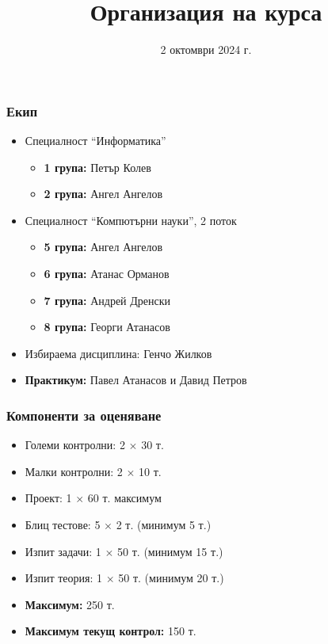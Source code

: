 \documentclass[alsotrans]{beamerswitch}
\title{Организация на курса}
\date{2 октомври 2024 г.}
\begin{document}
\begin{frame}
  \titlepage
\end{frame}

\begin{frame}
  \frametitle{Екип}

  \begin{itemize}
  \item Специалност ``Информатика''
    \begin{itemize}
    \item \textbf{1 група:} Петър Колев
    \item \textbf{2 група:} Ангел Ангелов
    \end{itemize}
  \item Специалност ``Компютърни науки'', 2 поток
    \begin{itemize}
    \item \textbf{5 група:} Ангел Ангелов
    \item \textbf{6 група:} Атанас Орманов
    \item \textbf{7 група:} Андрей Дренски
    \item \textbf{8 група:} Георги Атанасов
    \end{itemize}
  \item Избираема дисциплина: Генчо Жилков
  \item \textbf{Практикум:} Павел Атанасов и Давид Петров
\end{itemize}
\end{frame}

\begin{frame}
  \frametitle{Компоненти за оценяване}

  \begin{itemize}
  \item Големи контролни: 2 $\times$ 30 т.
  \item Малки контролни: 2 $\times$ 10 т.
  \item Проект: 1 $\times$ 60 т. максимум
  \item Блиц тестове: 5 $\times$ 2 т. \alert{(минимум 5 т.)}
  \item Изпит задачи: 1 $\times$ 50 т. \alert{(минимум 15 т.)}
  \item Изпит теория: 1 $\times$ 50 т. \alert{(минимум 20 т.)}
  \item \textbf{Максимум:} 250 т.
  \item \textbf{Максимум текущ контрол:} 150 т.
  \end{itemize}
\end{frame}
\end{document}

